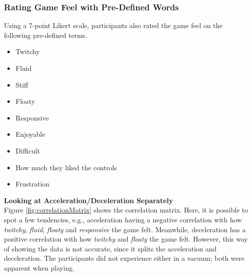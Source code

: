 \subsubsection{Rating Game Feel with Pre-Defined Words}
Using a 7-point Likert scale, participants also rated the game feel on the following pre-defined terms.
\begin{itemize}[noitemsep,nolistsep]
\item Twitchy
\item Fluid
\item Stiff
\item Floaty
\item Responsive
\item Enjoyable
\item Difficult
\item How much they liked the controls
\item Frustration
\end{itemize}

\textbf{Looking at Acceleration/Deceleration Separately}\\
Figure \ref{fig:correlationMatrix} shows the correlation matrix. Here, it is possible to spot a few tendencies, e.g., acceleration having a negative correlation with how \textit{twitchy}, \textit{fluid}, \textit{floaty} and \textit{responsive} the game felt. Meanwhile, deceleration has a positive correlation with how \textit{twitchy} and \textit{floaty} the game felt. However, this way of showing the data is not accurate, since it splits the acceleration and deceleration. The participants did not experience either in a vacuum; both were apparent when playing.



